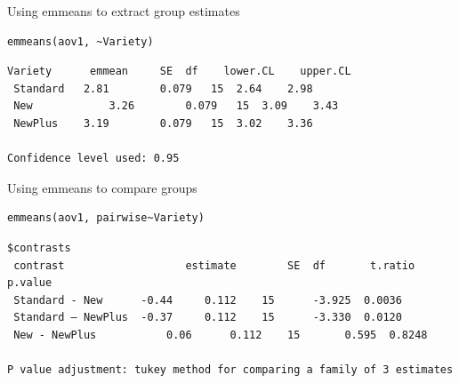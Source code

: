 \documentclass{beamer}
\makeatletter
\newenvironment{kframe}{%
 \def\at@end@of@kframe{}%
 \ifinner\ifhmode%
  \def\at@end@of@kframe{\end{minipage}}%
  \begin{minipage}{\columnwidth}%
 \fi\fi%
 \def\FrameCommand##1{\hskip\@totalleftmargin \hskip-\fboxsep
 \colorbox{shadecolor}{##1}\hskip-\fboxsep
     \hskip-\linewidth \hskip-\@totalleftmargin \hskip\columnwidth}%
 \MakeFramed {\advance\hsize-\width
   \@totalleftmargin\z@ \linewidth\hsize
   \@setminipage}}%
 {\par\unskip\endMakeFramed%
 \at@end@of@kframe}
\newenvironment{knitrout}{}{} %
\makeatother
\begin{document}
\begin{frame}[fragile]{Using emmeans to extract group estimates}
   \begin{knitrout}
\color{fgcolor}\begin{kframe}
\footnotesize
\begin{verbatim}
emmeans(aov1, ~Variety)
\end{verbatim}
\end{kframe}
\end{knitrout}
 
   \begin{knitrout}
\color{fgcolor}\begin{kframe}
\footnotesize
\begin{verbatim}
Variety   	 emmean   	SE 	df    lower.CL    upper.CL
 Standard 	2.81 		0.079 	15 	2.64 	2.98
 New      		3.26 		0.079 	15 	3.09 	3.43
 NewPlus  	3.19 		0.079 	15 	3.02 	3.36
 
Confidence level used: 0.95 
\end{verbatim}
\end{kframe}
\end{knitrout}

\end{frame}

\begin{frame}[fragile]{Using emmeans to compare groups}
   \begin{knitrout}
\color{fgcolor}\begin{kframe}
\footnotesize
\begin{verbatim}
emmeans(aov1, pairwise~Variety)
\end{verbatim}
\end{kframe}
\end{knitrout}
 
   \begin{knitrout}
\color{fgcolor}\begin{kframe}
\footnotesize
\begin{verbatim}
$contrasts
 contrast              		estimate        SE 	df  	 t.ratio  p.value
 Standard - New    	 -0.44 	   0.112 	15  	-3.925  0.0036
 Standard – NewPlus	 -0.37 	   0.112 	15  	-3.330  0.0120
 New - NewPlus      	 0.06 	   0.112 	15   	 0.595  0.8248
 
P value adjustment: tukey method for comparing a family of 3 estimates
\end{verbatim}
\end{kframe}
\end{knitrout}

\end{frame}
\end{document}
